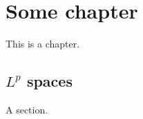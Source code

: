 \chapter{Some chapter}
This is a chapter.

\section{\texorpdfstring{$L^p$}{L\^{}p} spaces}
A section.

